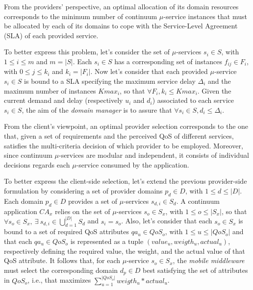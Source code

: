 From the providers' perspective, an optimal allocation of its domain resources corresponds to the minimum number of continuum $\mu$-service instances that must be allocated by each of its domains to cope with the Service-Level Agreement (SLA) of each provided service.%

To better express this problem, let's consider the set of $\mu$-services $s_i \in S$, with $1 \le i \le m$ and $m = |S|$. Each $s_i \in S$ has a corresponding set of instances $f_{ij} \in F_i$, with $0 \le j \le k_i$ and $k_i = |F_i|$. Now let's consider that each provided $\mu$-service $s_i \in S$ is bound to a SLA specifying the maximum service delay $\Delta_i$ and the maximum number of instances $Kmax_{i}$, so that $\forall F_i, k_i \le Kmax_{i}$. %
Given the current demand and delay (respectively $u_i$ and $d_i$) associated to each service $s_i \in S$, the aim of the \textit{domain manager} is to assure that $\forall s_i \in S, d_i \le \Delta_i$.



From the client's viewpoint, an optimal provider selection corresponds to the one that, given a set of requirements and the perceived QoS of different services, satisfies the multi-criteria decision of which provider to be employed. Moreover, since continuum $\mu$-services are modular and independent, it consists of individual decisions regards each $\mu$-service consumed by the application.

To better express the client-side selection, let's extend the previous provider-side formulation by considering a set of provider domains $p_d \in D$, with $1 \le d \le |D|$. Each domain $p_d \in D$ provides a set of $\mu$-services $s_{d,i} \in S_d$. A continuum application $CA_x$ relies on the set of $\mu$-services $s_o \in S_x$, with $1 \le o \le |S_x|$, so that $\forall s_o \in S_x,\ \exists\ s_{d,i} \in \bigcup_{d=1}^{|D|} S_d$ and $s_i = s_o$. Also, let's consider that each $s_o \in S_x$ is bound to a set of required QoS attributes $qa_u \in QoS_o$, with $1 \le u \le |QoS_o|$ and that each $qa_u \in QoS_o$ is represented as a tuple $(value_u, weigth_u, actual_u)$, respectively defining the required value, the weight, and the actual value of that QoS attribute. It follows that, for each $\mu$-service $s_o \in S_x$, the \textit{mobile middleware} must select the corresponding domain $d_p \in D$ best satisfying the set of attributes in $QoS_o$, i.e., that maximizes $\sum_{u=1}^{|QoS_o|} weigth_u * actual_u$.

